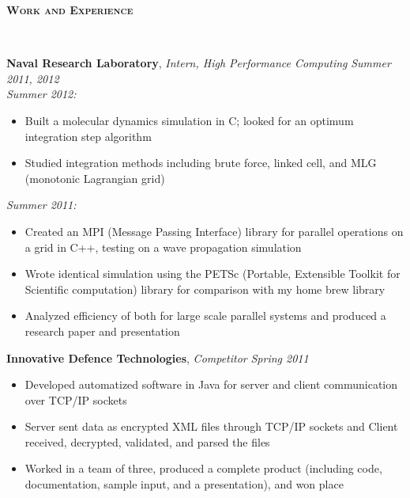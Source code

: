 \documentclass{article}
\newenvironment{changemargin}[2]{%
  \begin{list}{}{%
    \setlength{\topsep}{0pt}%
    \setlength{\leftmargin}{#1}%
    \setlength{\rightmargin}{#2}%
    \setlength{\listparindent}{\parindent}%
    \setlength{\itemindent}{\parindent}%
    \setlength{\parsep}{\parskip}%
  }%
  \item[]}{\end{list}
}
\newcommand{\lineover}{
	\begin{changemargin}{-0.05in}{-0.05in}
		\vspace*{-8pt}
		\hrulefill \\
		\vspace*{-2pt}
	\end{changemargin}
}
\newcommand{\header}[1]{
	\begin{changemargin}{-0.5in}{-0.5in}
		{\large \textbf{\scshape{#1}}}\\
  	\lineover
	\end{changemargin}
}
\newenvironment{body} {
	\vspace*{-16pt}
	\begin{changemargin}{-0.25in}{-0.5in}
  }	
	{\end{changemargin}
}
\begin{document}
\smallskip


\header{Work and Experience}

\begin{body}
	\vspace{14pt}
	\textbf{Naval Research Laboratory}, \emph{Intern, High Performance Computing} \hfill \emph{Summer 2011, 2012}\\
	\emph{Summer 2012:}
	\begin{itemize}%
		\item Built a molecular dynamics simulation in C; looked for an optimum integration step algorithm
		\item Studied integration methods including brute force, linked cell, and MLG (monotonic Lagrangian grid)
	\end{itemize}
	
	\emph{Summer 2011:}
	\begin{itemize}%
		\item Created an MPI (Message Passing Interface) library for parallel operations on a grid in C++, testing on a wave propagation simulation
		\item Wrote identical simulation using the PETSc (Portable, Extensible Toolkit for Scientific computation) library for comparison with my home brew library
		\item Analyzed efficiency of both for large scale parallel systems and produced a research paper and presentation
	\end{itemize}	
	
	\medskip
	
	\textbf{Innovative Defence Technologies}, \emph{Competitor} \hfill \emph{Spring 2011}\\
	\vspace*{-4pt}
	\begin{itemize}%
		\item Developed automatized software in Java for server and client communication over TCP/IP sockets
		\item Server sent data as encrypted XML files through TCP/IP sockets and Client received, decrypted, validated, and parsed the files
		\item Worked in a team of three, produced a complete product (including code, documentation, sample input, and a presentation), and won  place
	\end{itemize}
\end{body}
\end{document}
